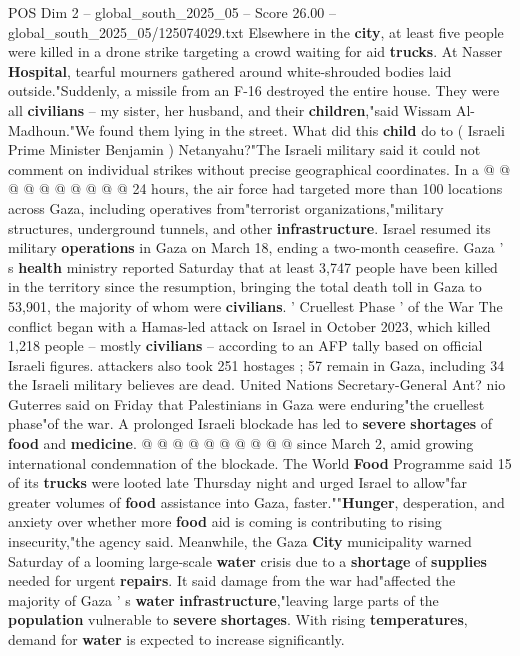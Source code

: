 \begin{textsample}{POS Dim 2 – global\_south\_2025\_05 – Score 26.00 – global\_south\_2025\_05/125074029.txt}
Elsewhere in the \textbf{city}, at least five people were killed in a drone strike targeting a crowd waiting for aid \textbf{trucks}.
At Nasser \textbf{Hospital}, tearful mourners gathered around white-shrouded bodies laid outside."Suddenly, a missile from an F-16 destroyed the entire house.
They were all \textbf{civilians} -- my sister, her husband, and their \textbf{children},"said Wissam Al-Madhoun."We found them lying in the street.
What did this \textbf{child} do to ( Israeli Prime Minister Benjamin ) Netanyahu?"The Israeli military said it could not comment on individual strikes without precise geographical coordinates.
In a @ @ @ @ @ @ @ @ @ @ 24 hours, the air force had targeted more than 100 locations across Gaza, including operatives from"terrorist organizations,"military structures, underground tunnels, and other \textbf{infrastructure}.
Israel resumed its military \textbf{operations} in Gaza on March 18, ending a two-month ceasefire.
Gaza ' s \textbf{health} ministry reported Saturday that at least 3,747 people have been killed in the territory since the resumption, bringing the total death toll in Gaza to 53,901, the majority of whom were \textbf{civilians}. ' Cruellest Phase ' of the War The conflict began with a Hamas-led attack on Israel in October 2023, which killed 1,218 people -- mostly \textbf{civilians} -- according to an AFP tally based on official Israeli figures. attackers also took 251 hostages ; 57 remain in Gaza, including 34 the Israeli military believes are dead.
United Nations Secretary-General Ant? nio Guterres said on Friday that Palestinians in Gaza were enduring"the cruellest phase"of the war.
A prolonged Israeli blockade has led to \textbf{severe} \textbf{shortages} of \textbf{food} and \textbf{medicine}. @ @ @ @ @ @ @ @ @ @ since March 2, amid growing international condemnation of the blockade.
The World \textbf{Food} Programme said 15 of its \textbf{trucks} were looted late Thursday night and urged Israel to allow"far greater volumes of \textbf{food} assistance into Gaza, faster.""\textbf{Hunger}, desperation, and anxiety over whether more \textbf{food} aid is coming is contributing to rising insecurity,"the agency said.
Meanwhile, the Gaza \textbf{City} municipality warned Saturday of a looming large-scale \textbf{water} crisis due to a \textbf{shortage} of \textbf{supplies} needed for urgent \textbf{repairs}.
It said damage from the war had"affected the majority of Gaza ' s \textbf{water} \textbf{infrastructure},"leaving large parts of the \textbf{population} vulnerable to \textbf{severe} \textbf{shortages}.
With rising \textbf{temperatures}, demand for \textbf{water} is expected to increase significantly.

\end{textsample}
